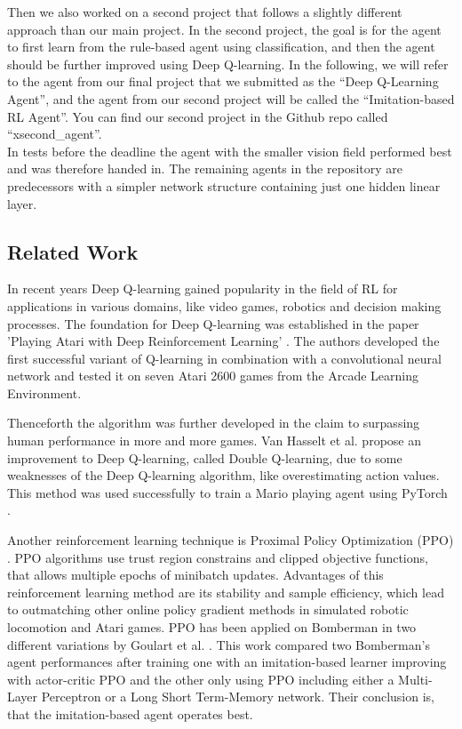 \noindent Then we also worked on a second project that follows a slightly different approach than our main project. In the second project, 
the goal is for the agent to first learn from the rule-based agent using classification, and then the agent should be further improved 
using Deep Q-learning. In the following, we will refer to the agent from our final project that we 
submitted as the ``Deep Q-Learning Agent'', and the agent from our second project will be called the ``Imitation-based RL Agent''.
You can find our second project in the Github repo called ``xsecond\_agent''.\\

\noindent In tests before the deadline the agent with the smaller vision field performed best and was therefore handed in.
The remaining agents in the repository are predecessors with a simpler network structure containing just one hidden linear layer.

\newpage
{}
\subsection{Related Work}

In recent years Deep Q-learning gained popularity in the field of RL for applications in various domains, like video games, robotics and decision making processes. The foundation for Deep Q-learning was established in the paper 'Playing Atari with Deep Reinforcement Learning' \cite{deepRL}. The authors developed the first successful variant of Q-learning in combination with a convolutional neural network and tested it on seven Atari 2600 games from the Arcade Learning Environment.

Thenceforth the algorithm was further developed in the claim to surpassing human performance in more and more games. Van Hasselt et al. \cite{doubleQ} propose an improvement to Deep Q-learning, called Double Q-learning, due to some weaknesses of the Deep Q-learning algorithm, like overestimating action values. This method was used successfully to train a Mario playing agent using PyTorch \cite{mario}.

Another reinforcement learning technique is Proximal Policy Optimization (PPO) \cite{ppo}. PPO algorithms use trust region constrains and clipped objective functions, that allows multiple epochs of minibatch updates. Advantages of this reinforcement learning method are its stability and sample efficiency, which lead to outmatching other online policy gradient methods in simulated robotic locomotion and Atari games. PPO has been applied on Bomberman in two different variations by Goulart et al. \cite{ppobomberman}. This work compared two Bomberman's agent performances after training one with an imitation-based learner improving with actor-critic PPO and the other only using PPO including either a Multi-Layer Perceptron or a Long Short Term-Memory network. Their conclusion is, that the imitation-based agent operates best. 